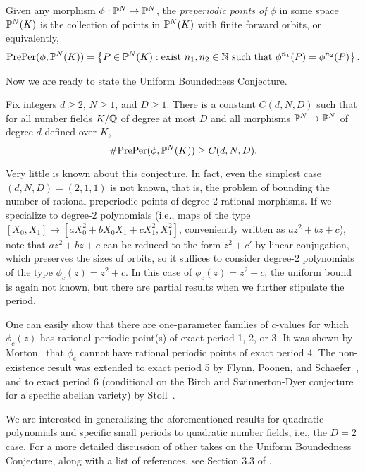 \begin{definition}
  Given any morphism $\phi: \P^N \to \P^N$, the \emph{preperiodic
    points of $\phi$} in some space $\P^N(K)$ is the collection of
  points in $\P^N(K)$ with finite forward orbits, or equivalently,
  \[
  \preper(\phi, \P^N(K)) = \set{P \in \P^N(K) : \text{exist $n_1, n_2
      \in \N$ such that $\phi^{n_1}(P) = \phi^{n_2}(P)$}}.
  \]
\end{definition}

Now we are ready to state the Uniform Boundedness Conjecture.

\begin{conjecture}
  Fix integers $d \ge 2$, $N \ge 1$, and $D \ge 1$. There is a
  constant $C(d, N, D)$ such that for all number fields $K/\Q$ of
  degree at most $D$ and all morphisms $\P^N \to \P^N$ of degree $d$
  defined over $K$,
  \[
  \#\preper(\phi, \P^N(K)) \ge C(d, N, D).
  \]
\end{conjecture}

Very little is known about this conjecture. In fact, even the simplest
case $(d, N, D) = (2, 1, 1)$ is not known, that is, the problem of
bounding the number of rational preperiodic points of degree-2
rational morphisms. If we specialize to degree-2 polynomials (i.e.,
maps of the type $[X_0, X_1] \mapsto [a X_0^2 + b X_0 X_1 + c X_1^2,
X_1^2]$, conveniently written as $a z^2 + b z + c$), note that $a z^2
+ b z + c$ can be reduced to the form $z^2 + c'$ by linear
conjugation, which preserves the sizes of orbits, so it suffices to
consider degree-2 polynomials of the type $\phi_c(z) = z^2 + c$. In
this case of $\phi_c(z) = z^2 + c$, the uniform bound is again not
known, but there are partial results when we further stipulate the
period.

One can easily show that there are one-parameter families of
$c$-values for which $\phi_c(z)$ has rational periodic point(s) of
exact period 1, 2, or 3. It was shown by Morton~\cite{MR1665198} that
$\phi_c$ cannot have rational periodic points of exact period 4. The
non-existence result was extended to exact period 5 by Flynn, Poonen,
and Schaefer~\cite{MR1480542}, and to exact period 6 (conditional on
the Birch and Swinnerton-Dyer conjecture for a specific abelian
variety) by Stoll~\cite{MR2465796}.

We are interested in generalizing the aforementioned results for
quadratic polynomials and specific small periods to quadratic number
fields, i.e., the $D = 2$ case. For a more detailed discussion of
other takes on the Uniform Boundedness Conjecture, along with a list
of references, see Section 3.3 of \cite{MR2316407}.

